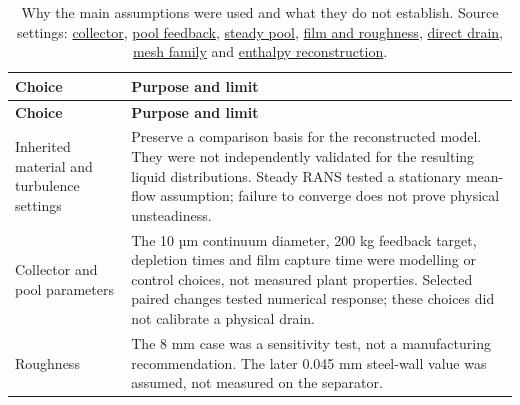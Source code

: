 \begin{longtable}{@{}>{\raggedright\arraybackslash}p{0.29000000\dimexpr\linewidth-2\tabcolsep\relax}>{\raggedright\arraybackslash}p{0.71000000\dimexpr\linewidth-2\tabcolsep\relax}@{}}
\caption{Why the main assumptions were used and what they do not establish. Source settings: \href{https://github.com/Shuhei-uni/P4P_knowledgeWiki/blob/main/Project/experiments/phase-07b-full-geometry-liquid-removal/s040-collector/setup.md}{collector}, \href{https://github.com/Shuhei-uni/P4P_knowledgeWiki/blob/main/Project/experiments/phase-06-full-geometry-with-brine-pool/results.md}{pool feedback}, \href{https://github.com/Shuhei-uni/P4P_knowledgeWiki/blob/main/Project/experiments/phase-09-steady-vof-pool/setup.md}{steady pool}, \href{https://github.com/Shuhei-uni/P4P_knowledgeWiki/blob/main/Project/experiments/phase-07-2a-wall-liquid-routing/stage-04-ewf-wall-parameters/commercial-steel/setup.md}{film and roughness}, \href{https://github.com/Shuhei-uni/P4P_knowledgeWiki/blob/main/Project/experiments/phase-07-2a-wall-liquid-routing/stage-04-ewf-wall-parameters/ewf-only-drain/setup.md}{direct drain}, \href{https://github.com/Shuhei-uni/P4P_knowledgeWiki/blob/main/Project/experiments/phase-10-single-inlet-mesh-convergence/setup.md}{mesh family} and \href{https://github.com/Shuhei-uni/P4P_knowledgeWiki/blob/main/Project/experiments/phase-10-single-inlet-mesh-convergence/replication-enthalpy-sweep.md}{enthalpy reconstruction}.}\label{tab:table-D.1}\\
\toprule
\textbf{Choice} & \textbf{Purpose and limit} \\
\midrule
\endfirsthead
\toprule
\textbf{Choice} & \textbf{Purpose and limit} \\
\midrule
\endhead
Inherited material and turbulence settings & Preserve a comparison basis for the reconstructed model. They were not independently validated for the resulting liquid distributions. Steady RANS tested a stationary mean-flow assumption; failure to converge does not prove physical unsteadiness. \\
Collector and pool parameters & The 10 µm continuum diameter, 200 kg feedback target, depletion times and film capture time were modelling or control choices, not measured plant properties. Selected paired changes tested numerical response; these choices did not calibrate a physical drain. \\
Roughness & The 8 mm case was a sensitivity test, not a manufacturing recommendation. The later 0.045 mm steel-wall value was assumed, not measured on the separator. \\

\end{longtable}
